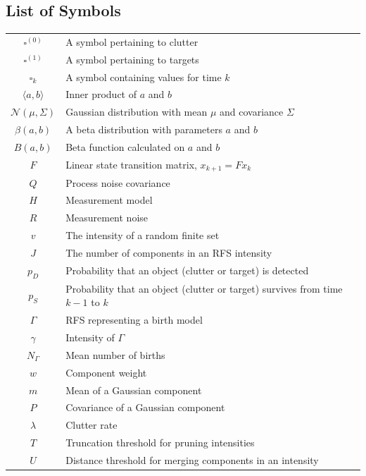 \documentclass{article}
\newcommand{\clut}{{(0)}}
\newcommand{\tgt}{{(1)}}
\begin{document}
\subsection*{List of Symbols}
\begin{table}[h]
  \begin{center}
    \begin{tabular}{ c l }
      $\square^\clut$ & A symbol pertaining to clutter\\
      $\square^\tgt$ & A symbol pertaining to targets\\
      $\square_k$ & A symbol containing values for time $k$\\
      $\langle a, b \rangle$ & Inner product of $a$ and $b$ \\
      $\mathcal{N}(\mu, \Sigma)$ & Gaussian distribution with mean $\mu$ and covariance $\Sigma$\\
      $\beta(a, b)$ & A beta distribution with parameters $a$ and $b$ \\
      $B(a, b)$ & Beta function calculated on $a$ and $b$ \\
      $F$ & Linear state transition matrix, $x_{k+1} = Fx_k$ \\
      $Q$ & Process noise covariance \\
      $H$ & Measurement model \\
      $R$ & Measurement noise \\
      $v$ & The intensity of a random finite set \\
      $J$ & The number of components in an RFS intensity \\
      $p_{D}$ & Probability that an object (clutter or target) is detected\\
      $p_{S}$ & Probability that an object (clutter or target) survives from time $k-1$ to $k$\\
      $\Gamma$ & RFS representing a birth model\\
      $\gamma$ & Intensity of $\Gamma$ \\
      $N_{\Gamma}$ & Mean number of births \\
      $w$ & Component weight \\
      $m$ & Mean of a Gaussian component \\
      $P$ & Covariance of a Gaussian component \\
      $\lambda$ & Clutter rate \\
      $T$ & Truncation threshold for pruning intensities\\
      $U$ & Distance threshold for merging components in an intensity \\

\end{tabular}
\end{center}
\end{table}
\end{document}
